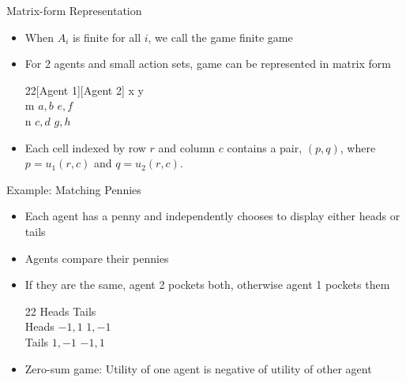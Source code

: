 \documentclass[11pt,aspectratio=169,handout]{beamer}
\begin{document}
  \begin{frame}{Matrix-form Representation}
   \begin{itemize}[<+->]
    \item When $A_i$ is finite for all $i$, we call the game \alert{finite game}
    \item For 2 agents and small action sets, game can be represented in \alert{matrix form}
    \vspace{0.7em}
    \begin{center}
     \hspace{-5.6em}
     \begin{game}{2}{2}[Agent 1][Agent 2]
      	\> x		\> y		\\
      m	\> $a,b$	\> $e,f$	\\
      n	\> $c,d$	\> $g,h$
     \end{game}
    \end{center}
    \vspace{0.7em}
    \item Each cell indexed by  row $r$ and column $c$ contains a pair, $(p,q)$, where $p = u_1(r,c)$ and $q = u_2(r,c)$.
   \end{itemize}
  \end{frame}
 
  \begin{frame}{Example: Matching Pennies}
   \begin{itemize}
    \item Each agent has a penny and independently chooses to display either heads or tails
    \item Agents compare their pennies
    \item<+-> If they are the same, agent 2 pockets both, otherwise agent 1 pockets them
    \begin{center}
     \hspace{-3.5em}
     \begin{game}{2}{2}
      		\> Heads		\> Tails		\\
      Heads	\> $-1,1$	\> $1,-1$	\\
      Tails	\> $1,-1$	\> $-1,1$
     \end{game}
    \end{center}
    \vspace{0.7em}
    \item<+-> \alert{Zero-sum game}: Utility of one agent is negative of utility of other agent
   \end{itemize}
  \end{frame}
\end{document}

